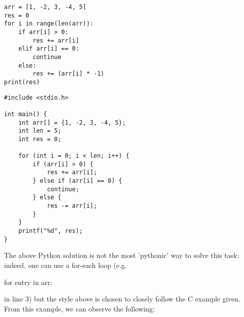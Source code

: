 \noindent
\begin{minipage}{0.40\textwidth}
\begin{verbatim}
arr = [1, -2, 3, -4, 5]
res = 0
for i in range(len(arr)):
    if arr[i] > 0:
        res += arr[i]
    elif arr[i] == 0:
        continue
    else:
        res += (arr[i] * -1)
print(res)
\end{verbatim}
\end{minipage}
\hfill
\begin{minipage}{0.40\textwidth}
\begin{verbatim}
#include <stdio.h>

int main() {
    int arr[] = {1, -2, 3, -4, 5};
    int len = 5;
    int res = 0;
    
    for (int i = 0; i < len; i++) {
        if (arr[i] > 0) {
            res += arr[i];
        } else if (arr[i] == 0) {
            continue;
        } else {
            res -= arr[i];
        }
    }
    printf("%d", res);
}
\end{verbatim}
\end{minipage}


The above Python solution is not the most 'pythonic' way to solve this task: indeed, one can use a for-each loop (e.g. \begin{typewriter}for entry in arr:\end{typewriter} in line 3) but the style above is chosen to closely follow the C example given. From this example, we can observe the following:

